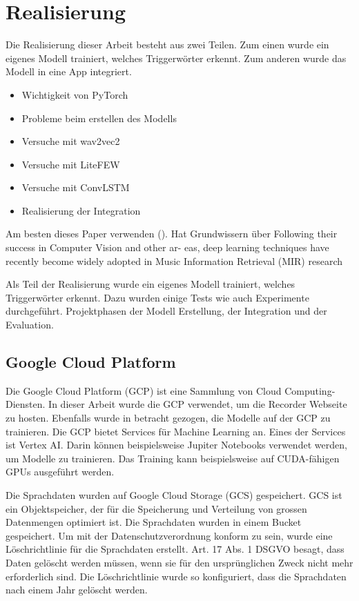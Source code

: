 \documentclass[11pt,a4paper]{article}
\begin{document}
\newpage \section{Realisierung}
Die Realisierung dieser Arbeit besteht aus zwei Teilen. Zum einen wurde ein eigenes Modell
trainiert, welches Triggerwörter erkennt. Zum anderen wurde das Modell in eine App integriert.

\begin{itemize}
	\item Wichtigkeit von PyTorch 
	\item Probleme beim erstellen des Modells
	\item Versuche mit wav2vec2
	\item Versuche mit LiteFEW
	\item Versuche mit ConvLSTM
	\item Realisierung der Integration
\end{itemize}


Am besten dieses Paper verwenden (\cite{choi2018tutorial}). Hat Grundwissern über 
Following their success in Computer Vision and other ar- eas, deep learning techniques have 
recently become widely adopted in Music Information Retrieval (MIR) research

Als Teil der Realisierung wurde ein eigenes Modell trainiert, welches Triggerwörter erkennt.
Dazu wurden einige Tests wie auch Experimente durchgeführt.
Projektphasen der Modell Erstellung, der Integration und der Evaluation.

\subsection{Google Cloud Platform}
Die Google Cloud Platform (GCP) ist eine Sammlung von Cloud Computing-Diensten. In dieser Arbeit
wurde die GCP verwendet, um die Recorder Webseite zu hosten. Ebenfalls wurde in betracht gezogen,
die Modelle auf der GCP zu trainieren. Die GCP bietet Services für Machine Learning an. Eines der
Services ist Vertex AI. Darin können beispielsweise Jupiter Notebooks verwendet werden, um Modelle
zu trainieren. Das Training kann beispielsweise auf CUDA-fähigen GPUs ausgeführt werden.

\noindent \newline
Die Sprachdaten wurden auf Google Cloud Storage (GCS) gespeichert. GCS ist ein Objektspeicher, der
für die Speicherung und Verteilung von grossen Datenmengen optimiert ist. Die Sprachdaten wurden
in einem Bucket gespeichert. Um mit der Datenschutzverordnung konform zu sein, wurde eine 
Löschrichtlinie für die Sprachdaten erstellt. Art. 17 Abs. 1 DSGVO besagt, dass Daten gelöscht 
werden müssen, wenn sie für den ursprünglichen Zweck nicht mehr erforderlich sind. Die
Löschrichtlinie wurde so konfiguriert, dass die Sprachdaten nach einem Jahr gelöscht werden.
\end{document}
